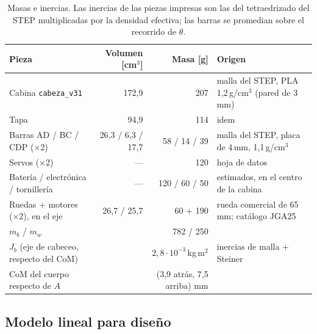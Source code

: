 \documentclass[11pt,a4paper]{article}
\newcommand{\code}[1]{\texttt{#1}}
\begin{document}
\begin{table}[H]
  \centering\small
  \begin{tabular}{lrrl}
    \toprule
    Pieza & Volumen [cm$^3$] & Masa [g] & Origen \\
    \midrule
    Cabina \code{cabeza\_v31} & 172{,}9 & 207 & malla del STEP, PLA 1{,}2\,g/cm$^3$ (pared de 3\,mm) \\
    Tapa & 94{,}9 & 114 & idem \\
    Barras AD / BC / CDP (×2) & 26{,}3 / 6{,}3 / 17{,}7 & 58 / 14 / 39 & malla del STEP, placa de 4\,mm, 1{,}1\,g/cm$^3$ \\
    Servos (×2) & — & 120 & hoja de datos \\
    Batería / electrónica / tornillería & — & 120 / 60 / 50 & estimados, en el centro de la cabina \\
    Ruedas + motores (×2), en el eje & 26{,}7 / 25{,}7 & 60 + 190 & rueda comercial de 65\,mm; catálogo JGA25 \\
    \midrule
    $m_b$ / $m_w$ & & 782 / 250 & \\
    $J_b$ (eje de cabeceo, respecto del CoM) & & $2{,}8\cdot10^{-3}$\,kg\,m$^2$ & inercias de malla + Steiner \\
    CoM del cuerpo respecto de $A$ & & (3{,}9 atrás, 7{,}5 arriba) mm & \\
    \bottomrule
  \end{tabular}
  \caption{Masas e inercias. Las inercias de las piezas impresas son las del tetraedrizado del STEP
  multiplicadas por la densidad efectiva; las barras se promedian sobre el recorrido de $\theta$.}
\end{table}

\subsection{Modelo lineal para diseño}
\end{document}
